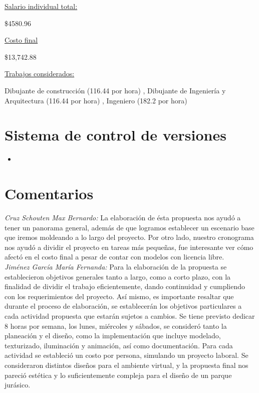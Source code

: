 \documentclass[12pt]{article} %
\begin{document}
	\underline{Salario individual total:}
	
	\$4580.96
	
	\underline{Costo final}
	
	\$13,742.88
	
	\underline{Trabajos considerados:}
	
	Dibujante de construcción 
	\color{gray}(116.44 por hora)\color{black}
	, Dibujante de Ingeniería y Arquitectura 
	\color{gray}(116.44 por hora)\color{black}
	, Ingeniero 
	\color{gray}(182.2 por hora)\color{black}	
	
	\section{Sistema de control de versiones}
	
	\begin{itemize}
		\item 
	\end{itemize}

	\section{Comentarios}
 	
	\emph{Cruz Schouten Max Bernardo:}
	La elaboración de ésta propuesta nos ayudó a tener un panorama general, además de que logramos establecer un escenario 
	base que iremos moldeando a lo largo del proyecto. Por otro lado, nuestro cronograma nos ayudó a dividir el proyecto en 
	tareas más pequeñas, fue interesante ver cómo afectó en el costo final a pesar de contar con modelos con licencia libre.
	\\
	
	\emph{Jiménez García María Fernanda:}
	Para la elaboración de la propuesta se establecieron objetivos generales tanto a largo, como a corto plazo, con la 
	finalidad de dividir el trabajo eficientemente, dando continuidad y cumpliendo con los requerimientos del proyecto. 
	Así mismo, es importante resaltar que durante el proceso de elaboración, se establecerán los objetivos particulares a 
	cada actividad propuesta que estarán sujetos a cambios. Se tiene previsto dedicar 8 horas por semana,  los lunes, 
	miércoles y sábados, se consideró tanto la planeación y el diseño, como la implementación que incluye modelado, 
	texturizado, iluminación y animación, así como documentación. Para cada actividad se estableció un costo por persona, 
	simulando un proyecto laboral. Se consideraron distintos diseños para el ambiente virtual, y la propuesta final nos pareció 
	estética y lo suficientemente compleja para el diseño de un parque jurásico.
	\\
	
\end{document}
